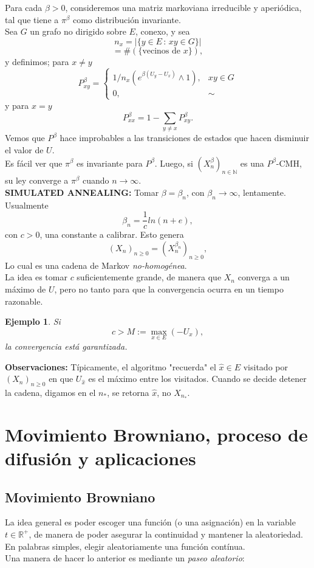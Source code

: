 \documentclass[a4paper]{article}
\newtheorem{ejemplo}{Ejemplo}
\numberwithin{equation}{subsection}
\def\R{\mathbb R}
\def\N{\mathbb N}
\begin{document}
Para cada $\beta >0$, consideremos una matriz markoviana irreducible y aperiódica, tal que tiene a $\pi^\beta$ como distribución invariante. \\ Sea $G$ un grafo no dirigido sobre $E$, conexo, y sea
\[n_x = |\{y \in E\,:\,xy \in G\}|\]
\[= \#\left(\{\text{vecinos de }x\}\right),\]
y definimos; para $x\neq y$
\[P_{xy}^\beta = \begin{cases}
1/n_x\left(e^{\beta(U_y-U_x)}\wedge 1\right), & xy\in G\\
0, & \sim
\end{cases}\]
y para $x=y$
\[P_{xx}^\beta = 1-\sum_{y \neq x}P_{xy}^\beta. \]
Vemos que $P^\beta$ hace improbables a las transiciones de estados que hacen disminuir el valor de $U$.\\ Es fácil ver que $\pi^\beta$ es invariante para $P^\beta$. Luego, si $(X_n^\beta)_{n\in \N}$ es una $P^\beta$-CMH, su ley converge a $\pi^\beta$ cuando $n\rightarrow \infty$. \\ \newline
\textbf{SIMULATED ANNEALING: }Tomar $\beta = \beta_n$, con $\beta_n \rightarrow \infty$, lentamente.\\ \newline
Usualmente
\[\beta_n = \frac{1}{c}ln(n+e),\]
con $c>0$, una constante a calibrar. Esto genera
\[(X_n)_{n\geq0} = (X_n^{\beta_n})_{n\geq 0},\]
Lo cual es una cadena de Markov \textit{no-homogénea}.\\La idea es tomar $c$ suficientemente grande, de manera que $X_n$ converga a un máximo de $U$, pero no tanto para que la convergencia ocurra en un tiempo razonable.
\begin{ejemplo}
Si 
\[c > M:=\max_{x \in E}\left(-U_x\right),\]
la convergencia está garantizada.
\end{ejemplo}

\textbf{Observaciones:} Típicamente, el algoritmo "recuerda" el $\hat{x}\in E$ visitado por $(X_n)_{n\geq 0}$ en que $U_{\hat{x}}$ es el máximo entre los visitados. Cuando se decide detener la cadena, digamos en el $n_{*}$, se retorna $\hat{x}$, no $X_{n_{*}}$.

\section{Movimiento Browniano, proceso de difusión y aplicaciones}
\subsection{Movimiento Browniano}
La idea general es poder escoger una función (o una asignación) en la variable $t\in \R^{+}$, de manera de poder asegurar la continuidad y mantener la aleatoriedad. En palabras simples, elegir aleatoriamente una función contínua.\\ \newline
Una manera de hacer lo anterior es mediante un \textit{paseo aleatorio}:
\end{document}

